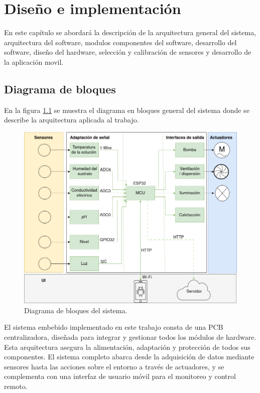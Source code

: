 \chapter{Diseño e implementación} %

\label{Chapter3} %

En este capítulo se abordará la descripción de la arquitectura general del sistema, arquitectura del software, modulos componentes del software, desarrollo del software, diseño del hardware, selección y calibración de sensores y desarrollo de la aplicación movil.
\section{Diagrama de bloques}
En la figura \ref{fig:d_bloques} se muestra el diagrama en bloques general del sistema donde se describe la arquitectura aplicada al trabajo.

\begin{figure}[h]
\centering
\includegraphics[scale=.4]{./Figures/d_bloques.png}
	\caption{Diagrama de bloques del sistema.}
	\label{fig:d_bloques}
\end{figure}

El sistema embebido implementado en este trabajo consta de una PCB centralizadora, diseñada para integrar y gestionar todos los módulos de hardware. Esta arquitectura asegura la alimentación, adaptación y protección de todos sus componentes. El sistema completo abarca desde la adquisición de datos mediante sensores hasta las acciones sobre el entorno a través de actuadores, y se complementa con una interfaz de usuario móvil para el monitoreo y control remoto.

